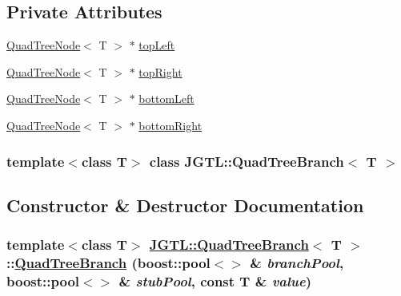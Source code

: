 \subsection*{Private Attributes}
\begin{CompactItemize}
\item 
\hyperlink{class_j_g_t_l_1_1_quad_tree_node}{Quad\-Tree\-Node}$<$ T $>$ $\ast$ \hyperlink{class_j_g_t_l_1_1_quad_tree_branch_91e216c7605fc50b7174393eb7e70c0a}{top\-Left}
\item 
\hyperlink{class_j_g_t_l_1_1_quad_tree_node}{Quad\-Tree\-Node}$<$ T $>$ $\ast$ \hyperlink{class_j_g_t_l_1_1_quad_tree_branch_daedd4440e92bcf7159a0b879e5e028a}{top\-Right}
\item 
\hyperlink{class_j_g_t_l_1_1_quad_tree_node}{Quad\-Tree\-Node}$<$ T $>$ $\ast$ \hyperlink{class_j_g_t_l_1_1_quad_tree_branch_3359e420228b5e7fd9f272b85e7517d8}{bottom\-Left}
\item 
\hyperlink{class_j_g_t_l_1_1_quad_tree_node}{Quad\-Tree\-Node}$<$ T $>$ $\ast$ \hyperlink{class_j_g_t_l_1_1_quad_tree_branch_a297958fd688ab38cb43e12a24a17020}{bottom\-Right}
\end{CompactItemize}
\subsubsection*{template$<$class T$>$ class JGTL::Quad\-Tree\-Branch$<$ T $>$}



\subsection{Constructor \& Destructor Documentation}
\hypertarget{class_j_g_t_l_1_1_quad_tree_branch_621e0d6cca450c0dabc2f5e60310ac0c}{
\subsubsection[QuadTreeBranch]{\setlength{\rightskip}{0pt plus 5cm}template$<$class T$>$ \hyperlink{class_j_g_t_l_1_1_quad_tree_branch}{JGTL::Quad\-Tree\-Branch}$<$ T $>$::\hyperlink{class_j_g_t_l_1_1_quad_tree_branch}{Quad\-Tree\-Branch} (boost::pool$<$$>$ \& {\em branch\-Pool}, boost::pool$<$$>$ \& {\em stub\-Pool}, const T \& {\em value})}}
\label{class_j_g_t_l_1_1_quad_tree_branch_621e0d6cca450c0dabc2f5e60310ac0c}


